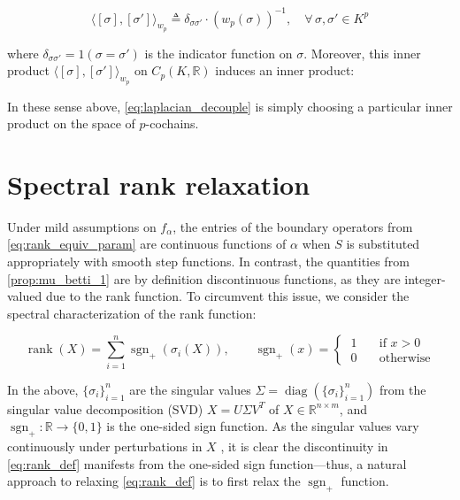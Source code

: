 \documentclass[pdflatex,sn-mathphys-num]{sn-jnl}
\begin{document}
\[\langle [\sigma] , [\sigma'] \rangle_{w_{p}} \triangleq \delta_{\sigma\sigma'} \cdot \left( w_{p}(\sigma) \right)^{- 1},\quad\forall\,\sigma,\sigma' \in K^{p}\] \protect{}\label{eq:inner_product_chain}{}

where \(\delta_{\sigma\sigma'} = \mathcal{1} (\sigma = \sigma') \) is the indicator function on \(\sigma\). Moreover, this inner product \(\langle [\sigma] , [\sigma'] \rangle_{w_{p}}\) on \(C_{p}\left( K,\mathbb{R} \right)\) induces an inner product:


In these sense above, \ref{eq:laplacian_decouple} is simply choosing a particular inner product on the space of \(p\)-cochains.

\section{Spectral rank relaxation}\label{sec:spectral_relax}

Under mild assumptions on \(f_{\alpha}\), the entries of the boundary operators from \ref{eq:rank_equiv_param} are continuous functions of \(\alpha\) when \(S\) is substituted appropriately with smooth step functions. In contrast, the quantities from \ref{prop:mu_betti_1} are by definition discontinuous functions, as they are integer-valued due to the rank function. To circumvent this issue, we consider the spectral characterization of the rank function:

\[\operatorname{rank}(X) = \sum_{i = 1}^{n}\operatorname{sgn}_{+}\left( \sigma_{i}(X) \right),\quad\quad\operatorname{sgn}_{+}(x) = \begin{cases}
\: 1 & \quad\text{if }x > 0 \\
\: 0 & \quad\text{otherwise}
\end{cases}\] \protect{}\label{eq:rank_def}{}

In the above, \(\{\sigma_{i}\}_{i = 1}^{n}\) are the singular values \(\Sigma = \operatorname{diag} \left( \{\sigma_{i}\}_{i = 1}^{n} \right) \) from the singular value decomposition (SVD) \(X = U\Sigma V^{T}\) of \(X \in \mathbb{R}^{n \times m}\), and \(\operatorname{sgn}_{+}:\mathbb{R} \rightarrow \{ 0,1\}\) is the one-sided sign function. As the singular values vary continuously under perturbations in \(X\) \cite{bhatia2013matrix}, it is clear the discontinuity in \ref{eq:rank_def} manifests from the one-sided sign function---thus, a natural approach to relaxing \ref{eq:rank_def} is to first relax the \(\operatorname{sgn}_{+}\) function.
\end{document}
